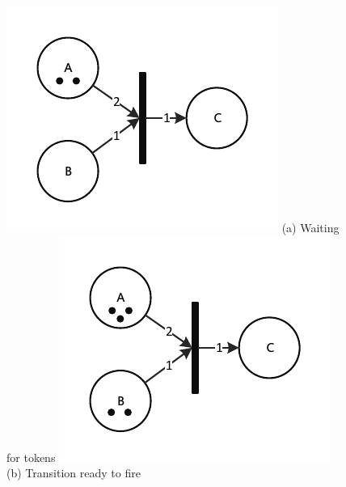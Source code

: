 \begin{figure}[!htb]
  \includegraphics[width=\linewidth]{drawings/Petri1.pdf}
  (a) Waiting for tokens
\endminipage\hfill
{}
  \includegraphics[width=\linewidth]{drawings/Petri2.pdf}
  (b) Transition ready to fire
\endminipage\hfill
{}%

\end{figure}
